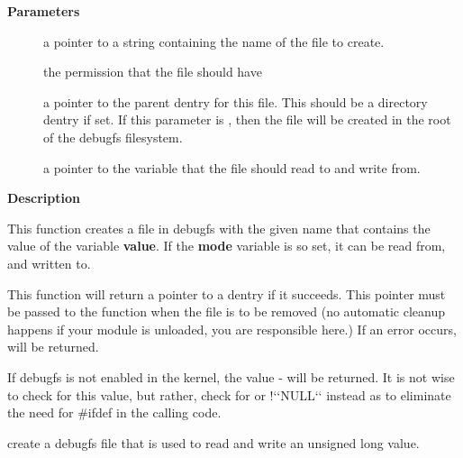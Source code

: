 \documentclass[a4paper,8pt,english]{sphinxmanual}
\begin{document}
\textbf{Parameters}
\begin{description}
\item[{}] \leavevmode
a pointer to a string containing the name of the file to create.

\item[{}] \leavevmode
the permission that the file should have

\item[{}] \leavevmode
a pointer to the parent dentry for this file.  This should be a
directory dentry if set.  If this parameter is , then the
file will be created in the root of the debugfs filesystem.

\item[{}] \leavevmode
a pointer to the variable that the file should read to and write
from.

\end{description}

\textbf{Description}

This function creates a file in debugfs with the given name that
contains the value of the variable \textbf{value}.  If the \textbf{mode} variable is so
set, it can be read from, and written to.

This function will return a pointer to a dentry if it succeeds.  This
pointer must be passed to the {\hyperref[filesystems/index:c.debugfs_remove]{\emph{}}} function when the file is
to be removed (no automatic cleanup happens if your module is unloaded,
you are responsible here.)  If an error occurs,  will be returned.

If debugfs is not enabled in the kernel, the value - will be
returned.  It is not wise to check for this value, but rather, check for
 or !{}`{}`NULL{}`{}` instead as to eliminate the need for \#ifdef in the calling
code.

\begin{fulllineitems}
\label{filesystems/index:c.debugfs_create_ulong}
create a debugfs file that is used to read and write an unsigned long value.

\end{fulllineitems}
\end{document}

